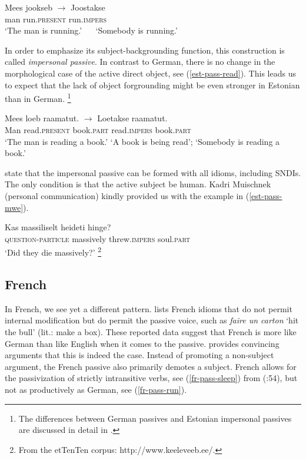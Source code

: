 \documentclass[output=paper]{langsci/langscibook}
\begin{document}
\ea
\gll Mees jookseb $\longrightarrow$ Joostakse\\
man run.\textsc{present} 	{}	run.\textsc{impers}\\
\glt `The man is running.'  	{}~~ 	`Somebody is running.'\label{est-pass-run}
\z

In order to emphasize its subject-backgrounding function, this construction is called \emph{impersonal passive}. In contrast to German, there is no change in the morpho\-logical case of the active direct object, see (\ref{est-pass-read}). This leads us to expect that the lack of object forgrounding might be even stronger in Estonian than in German.%
\footnote{The differences between German passives and Estonian impersonal passives are discussed in detail in \cite{Blevins:03}.}

\ea
\gll Mees loeb raamatut. $\longrightarrow$ {\quad} Loetakse raamatut.\\
Man read.\textsc{present} book.\textsc{part} {} {\quad} read.\textsc{impers} book.\textsc{part}\\
\glt `The man is reading a book.' {\quad}  {\quad}  {\quad}  `A book is being read'; `Somebody is reading
a book.'\label{est-pass-read}
\z

\cite{Muischnek:Kaalep:10} state that the impersonal passive can be formed with all idioms, including SNDIs. The only condition is that the active subject be human. Kadri Muischnek (personal communication) kindly provided us with the example in (\ref{est-pass-mwe}).

\ea
\gll Kas massiliselt heideti hinge?\label{est-pass-mwe}\\
\textsc{question-particle} massively threw.\textsc{impers} soul.\textsc{part} \\ 
\glt `Did they die massively?'%
\footnote{From the etTenTen corpus: http://www.keeleveeb.ee/.}
\z


\subsection{French}

In French, we see yet a different pattern. \cite{Abeille95} lists French idioms that do not permit internal modification but do permit the  passive voice, such as \textit{faire un carton} `hit the bull' (lit.: make a box). These reported data suggest that French is more like German than like English when it comes to the passive. \cite{Lamiroy:93} provides convincing arguments that this is indeed the case. Instead of promoting a non-subject argument, the French passive also primarily demotes a subject. French allows for the passivization of strictly intransitive verbs, see (\ref{fr-pass-sleep}) from \citeauthor{Lamiroy:93} (\citeyear{Lamiroy:93}:54), but not as productively as German, see (\ref{fr-pass-run}).
\end{document}
